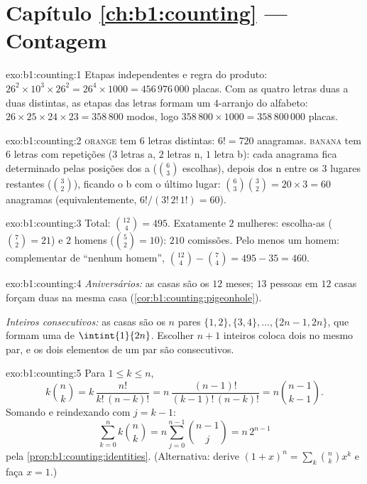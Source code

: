 \section*{Capítulo \ref{ch:b1:counting} --- Contagem}

\begin{solution}{exo:b1:counting:1}
Etapas independentes e regra do produto: $26^2 \times 10^3 \times 26^2
= 26^4 \times 1000 = 456\,976\,000$ placas. Com as quatro letras
duas a duas distintas, as etapas das letras formam um $4$-arranjo do
alfabeto: $26 \times 25 \times 24 \times 23 = 358\,800$ modos, logo
$358\,800 \times 1000 = 358\,800\,000$ placas.
\end{solution}

\begin{solution}{exo:b1:counting:2}
\textsc{orange} tem $6$ letras distintas: $6! = 720$ anagramas.
\textsc{banana} tem $6$ letras com repetições ($3$ letras a, $2$ letras n,
$1$ letra b): cada anagrama fica determinado pelas posições dos a
($\binom 63$ escolhas), depois dos n entre os $3$ lugares restantes
($\binom 32$), ficando o b com o último lugar:
$\binom{6}{3}\binom{3}{2} = 20 \times 3 = 60$ anagramas
(equivalentemente, $6!/(3!\,2!\,1!) = 60$).
\end{solution}

\begin{solution}{exo:b1:counting:3}
Total: $\binom{12}{4} = 495$. Exatamente $2$ mulheres: escolha-as
($\binom 72 = 21$) e $2$ homens ($\binom 52 = 10$): $210$ comissões.
Pelo menos um homem: complementar de ``nenhum homem'',
$\binom{12}{4} - \binom{7}{4} = 495 - 35 = 460$.
\end{solution}

\begin{solution}{exo:b1:counting:4}
\emph{Aniversários:} as casas são os $12$ meses; $13$ pessoas em $12$
casas forçam duas na mesma casa
(\cref{cor:b1:counting:pigeonhole}).

\emph{Inteiros consecutivos:} as casas são os $n$ pares $\{1,2\},
\{3,4\}, \dots, \{2n-1, 2n\}$, que formam uma  de $\intint{1}{2n}$.
Escolher $n + 1$ inteiros coloca dois no mesmo par, e os dois
elementos de um par são consecutivos.
\end{solution}

\begin{solution}{exo:b1:counting:5}
Para $1 \leq k \leq n$,
\[
k \binom nk = k\,\frac{n!}{k!\,(n-k)!}
= n\,\frac{(n-1)!}{(k-1)!\,(n-k)!} = n \binom{n-1}{k-1}.
\]
Somando e reindexando com $j = k - 1$:
\[
\sum_{k=0}^{n} k \binom nk = n \sum_{j=0}^{n-1} \binom{n-1}{j}
= n\, 2^{n-1}
\]
pela \cref{prop:b1:counting:identities}. (Alternativa: derive
$(1+x)^n = \sum_k \binom nk x^k$ e faça $x = 1$.)
\end{solution}

